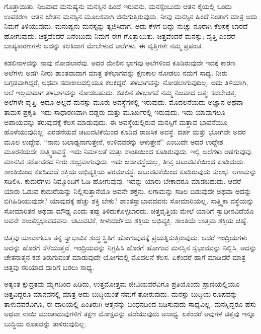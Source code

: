 ಗೊತ್ತಾಯಿತು. ನಿಜವಾದ ಮನುಷ್ಯನು ಮನಸ್ಸಿನ ಹಿಂದೆ ಇರುವನು. ಮನಸ್ಸೆಂಬುದು ಆತನ ಕೈಯಲ್ಲಿ ಒಂದು ಉಪಕರಣ. ಆತನ ಚೇತನ ಮನಸ್ಸಿನ ಮೂಲಕವಾಗಿ ಜಿನುಗುತ್ತಿರುವುದು. ನೀವು ಮನಸ್ಸಿನ ಹಿಂದೆ ನಿಂತಾಗ ಮಾತ್ರ ಅದು ನಿಮಗೆ ತಿಳಿಯುವುದು. ಮನುಷ್ಯನು ಮನಸ್ಸನ್ನು ತ್ಯಜಿಸಿದಾಗ, ಅದು ಕೆಳಗೆ ಬಿದ್ದು ನುಚ್ಚು ನೂರಾಗಿ ಕೆಲಸಕ್ಕೆ ಬಾರದೆ ಹೋಗುವುದು. ಚಿತ್ತವೆಂದರೆ ಏನೆಂಬುದು ನಿಮಗೆ ಈಗ ಗೊತ್ತಾಯಿತು. ಚಿತ್ತವೆಂದರೆ ಮನಸ್ಸು; ವೃತ್ತಿ ಎಂದರೆ ಬಾಹ್ಯಕಾರಣಗಳು ಅದನ್ನು ಕಲಕಿದಾಗ ಮೇಲೇಳುವ ಅಲೆಗಳು. ಈ ವೃತ್ತಿಗಳೇ ನಮ್ಮ ಪ್ರಪಂಚ. 

ಕಡಲಿನಾಳವನ್ನು ನಾವು ನೋಡಲಾರೆವು. ಅದರ ಮೇಲಿನ ಭಾಗವು ಅಲೆಗಳಿಂದ ಕೂಡಿರುವುದೇ ಇದಕ್ಕೆ ಕಾರಣ. ಅಲೆಗಳು ಅಡಗಿ ನೀರು ಶಾಂತವಾದಾಗ ಮಾತ್ರ ತಳಭಾಗವನ್ನು ಕ್ಷಣಕಾಲ ನೋಡಲು ನಮಗೆ ಸಾಧ್ಯ. ನೀರು ಬಗ್ಗಡವಾಗಿದ್ದರೆ, ಅಥವಾ ಸದಾಕಾಲದಲ್ಲಿಯೂ ಕಲಕಿದ್ದರೆ, ತಳಭಾಗವನ್ನು ನೋಡಲಾಗುವುದಿಲ್ಲ. ಅದು ತಿಳಿಯಾಗಿ, ಅಲೆ ಇಲ್ಲವಾದಾಗ ತಳಭಾಗವನ್ನು ನೋಡಬಹುದು. ಕಡಲಿನ ತಳಭಾಗವೆ ನಮ್ಮ ನಿಜವಾದ ಆತ್ಮ; ಕಡಲೇಚಿತ್ತ, ಅಲೆಗಳೇ ವೃತ್ತಿ. ಅದೂ ಅಲ್ಲದೆ ಮನಸ್ಸು ಮೂರು ಅವಸ್ಥೆಗಳಲ್ಲಿ ಇರುವುದು. ಮೊದಲನೆಯದು ಅಜ್ಞಾನ ಅಥವಾ ತಾಮಸ ಪ್ರಕೃತಿ. ಇದು ಸಾಧಾರಣವಾಗಿ ದಡ್ಡರು ಮತ್ತು ಮೂರ್ಖರಲ್ಲಿ ಇರುವುದು. ಇದು ಯಾವಾಗಲೂ ಅಪಾಯವನ್ನು ತರುವುದಕ್ಕೆ ಕೆಲಸ ಮಾಡುವುದು. ಈ ಅವಸ್ಥೆಯಲ್ಲಿರುವ ಮನಸ್ಸಿಗೆ ಮತ್ತಾವ ಭಾವನೆಯೂ ಹೊಳೆಯುವುದಿಲ್ಲ. ಎರಡನೆಯದೆ ಚಟುವಟಿಕೆಯಿಂದ ಕೂಡಿದ ರಾಜಸಿಕ ಅವಸ್ಥೆ. ದರ್ಪ ಮತ್ತು ಭೋಗವೇ ಅದರ ಮೂಲ ಉದ್ದೇಶ. “ನಾನು ಬಲಾಢ್ಯನಾಗುತ್ತೇನೆ, ಉಳಿದವರನ್ನು ಆಳುತ್ತೇನೆ” ಎಂಬುದೇ ಅದರ ಉದ್ದೇಶ. ಮೂರನೆಯದೇ ಸಾತ್ತ್ವಿಕಾವಸ್ಥೆ. ಇದು ನಿರ್ಮಲತೆ ಮತ್ತು ಶಾಂತಿಯಿಂದ ಕೂಡಿರುವುದು. ಇಲ್ಲಿ ಅಲೆಗಳು ಅಡಗುವುವು, ಮಾನಸಿಕ ಸರೋವರದ ನೀರು ಶುಭ್ರವಾಗುವುದು. ಇದು ಜಡಾವಸ್ಥೆಯಲ್ಲ, ತೀವ್ರ ಚಟುವಟಿಕೆಯಿಂದ ಕೂಡಿದುದು. ಶಾಂತಿಯಿಂದ ಕೂಡಿದುದೆ ಶಕ್ತಿಯ ಅಭಿವ್ಯಕ್ತಿಯ ಪರಮಾವಸ್ಥೆ. ಚಟುವಟಿಕೆಯಿಂದ ಕೂಡಿರುವುದು ಸುಲಭ. ಲಗಾಮನ್ನು ಸಡಿಲಿಸಿ. ಕುದುರೆಗಳು ನಿಮ್ಮೊಂದಿಗೆ ಓಡಿ ಹೋಗುವುವು. ಇದನ್ನು ಯಾರು ಬೇಕಾದರೂ ಮಾಡಬಹುದು. ಆದರೆ ಯಾರು ಓಡುವ ಕುದುರೆಯನ್ನು ನಿಲ್ಲಿಸುತ್ತಾನೆಯೊ ಅವನೇ ಶಕ್ತನು. ಲಗಾಮನ್ನು ಸಡಿಲ ಬಿಡುವುದೇ ಅಥವಾ ಅದನ್ನು ಬಿಗಿಹಿಡಿಯುವುದೇ? ಯಾವುದಕ್ಕೆ ಹೆಚ್ಚು ಶಕ್ತಿ ಬೇಕು? ಶಾಂತಸ್ವಾಭಾವದವನು ಸೋಮಾರಿಯಲ್ಲ. ಸಾತ್ತ್ವಿಕಾ ವಸ್ಥೆಯನ್ನು ಸೋಮಾರಿತನ ಅಥವಾ ಮೌಢ್ಯ ಎಂದು ತಪ್ಪು ತಿಳಿದುಕೊಳ್ಳಬಾರದು. ಚಿತ್ತವೃತ್ತಿಯ ಮೇಲೆ ಯಾರಿಗೆ ಸ್ವಾಧೀನವಿದೆಯೊ ಅವನೇ ಶಾಂತಸ್ವಭಾವದವನು. ಚಟುವಟಿಕೆ, ಕೀಳುದರ್ಜೆಯ ಶಕ್ತಿಯ ಅಭಿವ್ಯಕ್ತಿ. ಶಾಂತಿಯೆ ಉತ್ತಮ ಶಕ್ತಿಯ ಚಿಹ್ನೆ. 

ಚಿತ್ತವು ಯಾವಾಗಲೂ ತನ್ನ ಸ್ವಾಭಾವಿಕ ಶುದ್ಧ ಸ್ಥಿತಿಗೆ ಹೋಗುವುದಕ್ಕೆ ಪ್ರಯತ್ನಿಸುತ್ತಿರುವುದು. ಆದರೆ ಇಂದ್ರಿಯಗಳು ಅದನ್ನು ಹೊರಗೆ ಸೆಳೆಯುತ್ತವೆ. ಇಂದ್ರಿಯವನ್ನು ನಿಗ್ರಹಿಸಿ ಹೊರಗೆ ಹೋಗುವ ಮನಸ್ಸಿನ ಸ್ವಭಾವವನ್ನು ನಿಲ್ಲಿಸಿ, ಅದನ್ನು ಚೇತನಾತ್ಮನ ಕಡೆ ತಿರುಗುವಂತೆ ಮಾಡುವುದೇ ಯೋಗದಲ್ಲಿ ಮೊದಲನೆ ಕೆಲಸ. ಏಕೆಂದರೆ ಹಾಗೆ ಮಾಡಿದರೆ ಮಾತ್ರ ಚಿತ್ತವು ಸರಿಯಾದ ದಾರಿಗೆ ಬರಲು ಸಾಧ್ಯ. 

ಅತ್ಯಂತ ಕ್ಷುದ್ರತಮ ಮೃಗದಿಂದ ಹಿಡಿದು, ಉತ್ತಮೋತ್ತಮ ಜೀವಿಯವರೆವಿಗೂ ಪ್ರತಿಯೊಂದು ಪ್ರಾಣಿಯಲ್ಲಿಯೂ ಚಿತ್ತವಿದ್ದರೂ ಮಾನವನಲ್ಲಿ ಮಾತ್ರ ಅದು ಬುದ್ಧಿಯಂತೆ ನಮಗೆ ತೋರುವುದು. ಮನಸ್ಸು ಬುದ್ಧಿಯ ರೂಪವನ್ನು ತಾಳುವವರೆವಿಗೂ, ಈ ದಾರಿಯಲ್ಲಿ ಹಿಂತಿರುಗಿ ಆತ್ಮನನ್ನು ಬಂಧನದಿಂದ ಬಿಡಿಸುವುದು ಸಾಧ್ಯವಿಲ್ಲ. ಮನಸ್ಸಿದ್ದರೂ ಹಸು ಅಥವಾ ನಾಯಿ ಮುಂತಾದುವುಗಳಿಗೆ ತಕ್ಷಣ ಮೋಕ್ಷವನ್ನು ಪಡೆಯುವುದು ಅಸಾಧ್ಯ. ಏಕೆಂದರೆ ಅವುಗಳ ಚಿತ್ತವು ಇನ್ನೂ ಬುದ್ಧಿಯ ರೂಪವನ್ನು ತಾಳಿರುವುದಿಲ್ಲ. 

